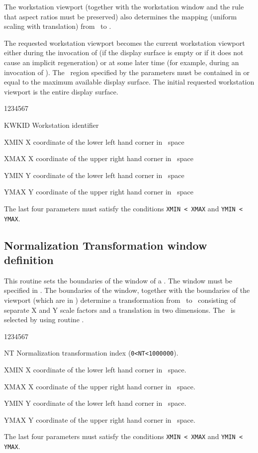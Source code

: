 The workstation viewport (together with the workstation window and the rule that
aspect ratios must be preserved) also determines the mapping (uniform scaling
with translation) from \NDC~to \DC.

The requested workstation viewport becomes the current workstation viewport
either during the invocation of  (if the display surface is empty
or if it does not cause an implicit regeneration) or at some later time (for
example, during an invocation of ). The \DC~region
specified by the parameters must be contained in  or equal to the maximum
available display  surface. The initial requested workstation viewport is the
entire display surface.
\Pdesc
\begin{DLtt}{1234567}
\item[KWKID]Workstation identifier
\item[XMIN] X coordinate of the lower left hand corner in \dc~space
\item[XMAX] X coordinate of the upper right hand corner in \dc~space
\item[YMIN] Y coordinate of the lower left hand corner in \dc~space
\item[YMAX] Y coordinate of the upper right hand corner in \dc~space
\end{DLtt}
The last four parameters must satisfy the conditions {\tt XMIN < XMAX} and
{\tt YMIN < YMAX}.
%
\subsection{Normalization Transformation window definition}
\Action
This routine sets the boundaries of the window of a \NT. The window must be
specified in \WC. The boundaries of the window, together with the
boundaries of the viewport (which are in \NDC)
determine a transformation from \WC~to \NDC~consisting of
separate X and Y scale factors and a translation in two dimensions. The \NT~is
selected by using routine .
\Pdesc
\begin{DLtt}{1234567}
\item[NT]   Normalization transformation index ({\tt 0<NT<1000000}).
\item[XMIN] X coordinate of the lower left hand corner in \wc~space.
\item[XMAX] X coordinate of the upper right hand corner in \wc~space.
\item[YMIN] Y coordinate of the lower left hand corner in \wc~space.
\item[YMAX] Y coordinate of the upper right hand corner in \wc~space.
\end{DLtt}
The last four parameters must satisfy the conditions {\tt XMIN < XMAX} and
{\tt YMIN < YMAX}.
%
